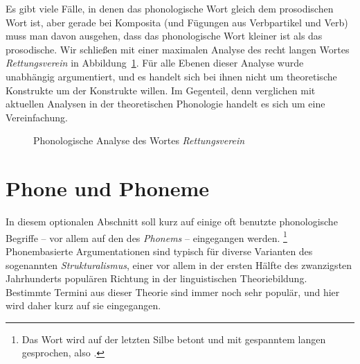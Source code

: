 Es gibt viele Fälle, in denen das phonologische Wort gleich dem prosodischen Wort ist, aber gerade bei Komposita (und \zB Fügungen aus Verbpartikel und Verb) muss man davon ausgehen, dass das phonologische Wort kleiner ist als das prosodische.
Wir schließen mit einer maximalen Analyse des recht langen Wortes \textit{Rettungsverein} in Abbildung~\ref{fig:rettungsverein}.
Für alle Ebenen dieser Analyse wurde unabhängig argumentiert, und es handelt sich bei ihnen nicht um theoretische Konstrukte um der Konstrukte willen.
Im Gegenteil, denn verglichen mit aktuellen Analysen in der theoretischen Phonologie handelt es sich um eine Vereinfachung.


\begin{figure}
 \centering
 \label{fig:rettungsverein}
 \caption{Phonologische Analyse des Wortes \textit{Rettungsverein}}
\end{figure}


\section[Phone und Phoneme]{\Opsional Phone und Phoneme}

\label{sec:phonephoneme}

In diesem optionalen Abschnitt soll kurz auf einige oft benutzte phonologische Begriffe -- vor allem auf den des \textit{Phonems} -- eingegangen werden.%
\footnote{Das Wort wird auf der letzten Silbe betont und mit gespanntem langen \textipa{[e:]} gesprochen, also \textipa{[fo}\Akz \textipa{ne:m]}.}
Phonembasierte Argumentationen sind typisch für diverse Varianten des sogenannten \textit{Strukturalismus}, einer vor allem in der ersten Hälfte des zwanzigsten Jahrhunderts populären Richtung in der linguistischen Theoriebildung.
Bestimmte Termini aus dieser Theorie sind immer noch sehr populär, und hier wird daher kurz auf sie eingegangen.

